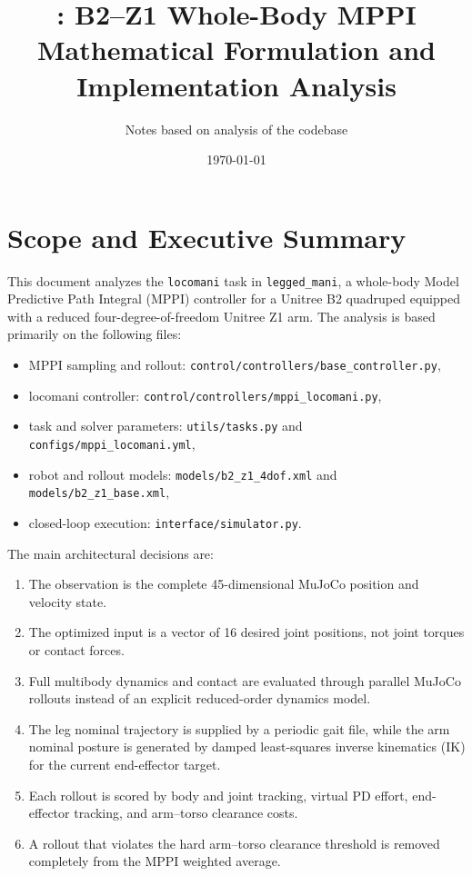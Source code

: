 \documentclass[11pt,a4paper]{article}
\title{\code{legged\_mani}: B2--Z1 Whole-Body MPPI\\
Mathematical Formulation and Implementation Analysis}
\author{Notes based on analysis of the \code{legged\_mani} codebase}
\date{\today}
\newcommand{\code}[1]{\texttt{#1}}
\begin{document}
\maketitle
\tableofcontents
\newpage

\section{Scope and Executive Summary}

This document analyzes the \code{locomani} task in \code{legged\_mani}, a
whole-body Model Predictive Path Integral (MPPI) controller for a Unitree B2
quadruped equipped with a reduced four-degree-of-freedom Unitree Z1 arm. The
analysis is based primarily on the following files:
\begin{itemize}
  \item MPPI sampling and rollout:
        \code{control/controllers/base\_controller.py},
  \item locomani controller:
        \code{control/controllers/mppi\_locomani.py},
  \item task and solver parameters:
        \code{utils/tasks.py} and \code{configs/mppi\_locomani.yml},
  \item robot and rollout models:
        \code{models/b2\_z1\_4dof.xml} and \code{models/b2\_z1\_base.xml},
  \item closed-loop execution:
        \code{interface/simulator.py}.
\end{itemize}

The main architectural decisions are:
\begin{enumerate}
  \item The observation is the complete 45-dimensional MuJoCo position and
        velocity state.
  \item The optimized input is a vector of 16 desired joint positions, not
        joint torques or contact forces.
  \item Full multibody dynamics and contact are evaluated through parallel
        MuJoCo rollouts instead of an explicit reduced-order dynamics model.
  \item The leg nominal trajectory is supplied by a periodic gait file, while
        the arm nominal posture is generated by damped least-squares inverse
        kinematics (IK) for the current end-effector target.
  \item Each rollout is scored by body and joint tracking, virtual PD effort,
        end-effector tracking, and arm--torso clearance costs.
  \item A rollout that violates the hard arm--torso clearance threshold is
        removed completely from the MPPI weighted average.
\end{enumerate}
\end{document}
